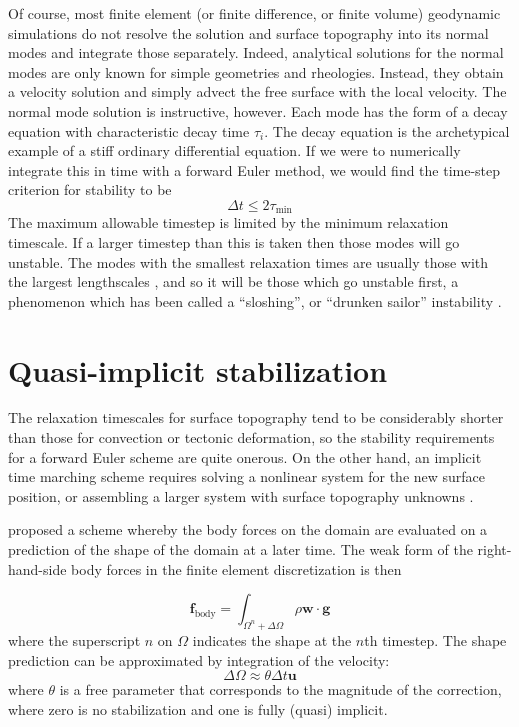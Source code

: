 \documentclass[preprint,12pt,authoryear]{elsarticle}
\begin{document}
Of course, most finite element (or finite difference, or finite volume) geodynamic simulations do not resolve 
the solution and surface topography into its normal modes and integrate those separately. 
Indeed, analytical solutions for the normal modes are only known for simple geometries and rheologies.
Instead, they obtain a velocity solution and simply advect the free surface with the local velocity.
The normal mode solution is instructive, however. 
Each mode has the form of a decay equation with characteristic decay time $\tau_i$.
The decay equation is the archetypical example of a stiff ordinary differential equation.
If we were to numerically integrate this in time with a forward Euler method, we would find the 
time-step criterion for stability \citep[e.g.][]{leveque2007finite} to be
\begin{equation}
\Delta t  \le 2 \tau_{\mathrm{min}}
\label{eq:cfl_euler}
\end{equation}
The maximum allowable timestep is limited by the minimum relaxation timescale.
If a larger timestep than this is taken then those modes will go unstable.
The modes with the smallest relaxation times are usually those with the largest lengthscales \citep{schubert2001mantle}, 
and so it will be those which go unstable first, a phenomenon which has been called 
a ``sloshing'', or ``drunken sailor'' instability \citep{kaus2010stabilization}.

\section{Quasi-implicit stabilization}
\label{sec:kmm}

The relaxation timescales for surface topography tend to be considerably shorter than those for 
convection or tectonic deformation, so the stability requirements for a forward Euler scheme
are quite onerous.  On the other hand, an implicit time marching scheme requires solving 
a nonlinear system for the new surface position, or assembling a larger system with surface
topography unknowns \citep[e.g.][]{kramer2012implicit}.

\citet{kaus2010stabilization} proposed a scheme whereby the body forces on the domain are 
evaluated on a prediction of the shape of the domain at a later time.
The weak form of the right-hand-side body forces in the finite element discretization is then

\begin{equation}
\mathbf{f}_{\mathrm{body}} = \int_{\Omega^n + \Delta \Omega} \rho \mathbf{w} \cdot \mathbf{g}
\label{eq:predict}
\end{equation}
where the superscript $n$ on $\Omega$ indicates the shape at the $n$th timestep.
The shape prediction can be approximated by integration of the velocity:
\begin{equation}
\Delta \Omega \approx \theta \Delta t \mathbf{u}
\end{equation}
where $\theta$ is a free parameter that corresponds to the magnitude of the 
correction, where zero is no stabilization and one is fully (quasi) implicit.
\end{document}
